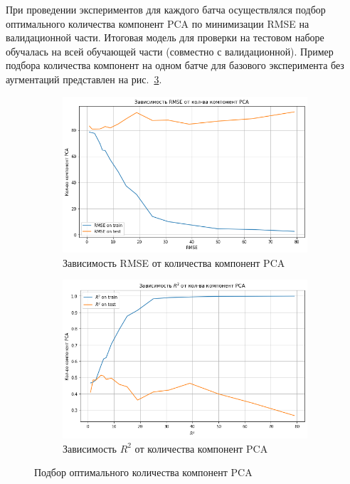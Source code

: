 \documentclass[a4paper,14pt]{article}
\begin{document}
    При проведении экспериментов для каждого батча осуществлялся подбор оптимального количества компонент PCA по минимизации RMSE на валидационной части. Итоговая модель для проверки на тестовом наборе обучалась на всей обучающей части (совместно с валидационной).
    Пример подбора количества компонент на одном батче для базового эксперимента без аугментаций представлен на рис.~\ref{fig:pca_optim}.

    \begin{figure}[H]
        \centering
        \begin{subfigure}{.5\textwidth}
            \centering
            \includegraphics[width=\linewidth]{images/pca_rmse}
            \caption{Зависимость RMSE от количества компонент PCA}
            \label{fig:pca_rmse}
        \end{subfigure}%
        \begin{subfigure}{.5\textwidth}
            \centering
            \includegraphics[width=\linewidth]{images/pca_r2}
            \caption{Зависимость $R^2$ от количества компонент PCA}
            \label{fig:pca_r2}
        \end{subfigure}
        \caption{Подбор оптимального количества компонент PCA}
        \label{fig:pca_optim}
    \end{figure}
\end{document}
